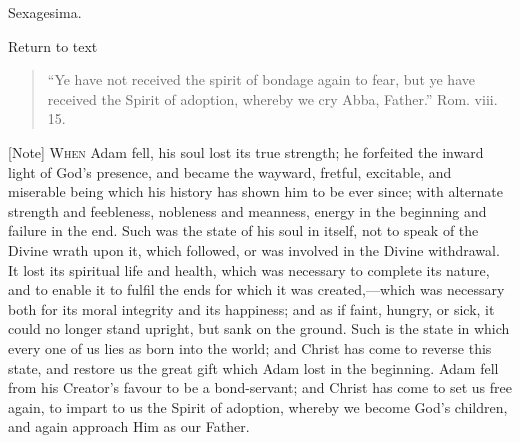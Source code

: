 
Sexagesima.

Return to text


\begin{quote}

``Ye have not received the spirit of bondage again to fear,
but ye have received the Spirit of adoption, whereby we cry Abba,
Father.'' Rom. viii. 15.

\end{quote}

[Note] W\textsc{hen} Adam fell, his soul
lost its true strength; he forfeited the inward light of God's
presence, and became the wayward, fretful, excitable, and miserable
being which his history has shown him to be ever since; with alternate
strength and feebleness, nobleness and meanness, energy in the
beginning and failure in the end. Such was the state of his soul in
itself, not to speak of the Divine wrath upon it, which followed, or
was involved in the Divine withdrawal. It lost its spiritual life and
health, which was necessary to complete its nature, and to enable it
to fulfil the ends for which it was created,—which was necessary
both for its moral integrity and its happiness; and as if faint,
hungry, or sick, it could no longer stand upright, but sank on the
ground. Such is the state in which every one of us lies as born into
the world; and Christ has come to reverse this state, and restore us
the great gift which Adam lost in the beginning. Adam fell from his
Creator's favour to be a bond-servant; and Christ has come to set us
free again, to impart to us the Spirit of adoption, whereby we become
God's children, and again approach Him as our Father.

